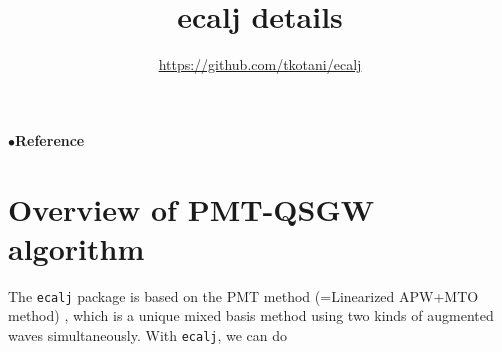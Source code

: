 \documentclass[a4paper,10pt,fleqn]{article}
\begin{document}
\baselineskip=6mm
\title{ ecalj details}
\author{\url{https://github.com/tkotani/ecalj}}
\maketitle


\tableofcontents
\vspace{5mm}
\noindent$\bullet${\bf Reference}

%





 


\newpage
\section{Overview of PMT-QSGW algorithm}
\label{sec:theory}
The {\tt ecalj} package is based on the PMT method (=Linearized APW+MTO method)
\cite{kotani2015pmt,kotani_linearized_2013,pmt1}, which is
a unique mixed basis method using two kinds of augmented waves simultaneously.
With {\tt ecalj}, we can do
\end{document}
